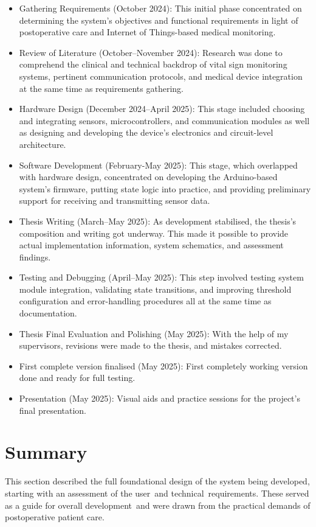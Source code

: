 \begin{itemize}
	\item Gathering Requirements (October 2024): This initial phase concentrated on determining the system's objectives and functional requirements in light of postoperative care and Internet of Things-based medical monitoring.
	\item Review of Literature (October–November 2024): Research was done to comprehend the clinical and technical backdrop of vital sign monitoring systems, pertinent communication protocols, and medical device integration at the same time as requirements gathering.
	\item Hardware Design (December 2024–April 2025): This stage included choosing and integrating sensors, microcontrollers, and communication modules as well as designing and developing the device's electronics and circuit-level architecture.
	\item Software Development (February-May 2025): This stage, which overlapped with hardware design, concentrated on developing the Arduino-based system's firmware, putting state logic into practice, and providing preliminary support for receiving and transmitting sensor data.
	\item Thesis Writing (March–May 2025): As development stabilised, the thesis's composition and writing got underway. This made it possible to provide actual implementation information, system schematics, and assessment findings.
	\item Testing and Debugging (April–May 2025): This step involved testing system module integration, validating state transitions, and improving threshold configuration and error-handling procedures all at the same time as documentation.
	\item Thesis Final Evaluation and Polishing (May 2025): With the help of my supervisors, revisions were made to the thesis, and mistakes corrected.
	\item First complete version finalised (May 2025): First completely working version done and ready for full testing.
	\item Presentation (May 2025): Visual aids and practice sessions for the project's final presentation.
\end{itemize}

\section{Summary} %
This section described the full foundational design of the system being developed, starting with an assessment of the user and technical requirements. These served as a guide for overall development and were drawn from the practical demands of postoperative patient care.

